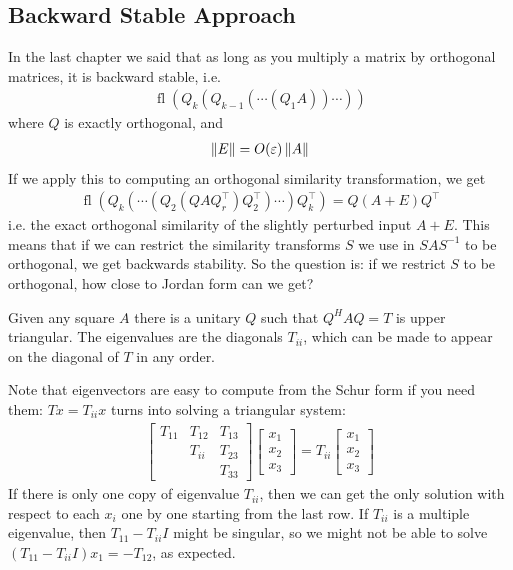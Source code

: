 \documentclass[11pt]{article}
\numberwithin{equation}{section}
\begin{document}
\subsection{Backward Stable Approach}
In the last chapter we said that as long as you multiply a matrix by orthogonal matrices, it is backward stable, i.e. \begin{align*}
    \operatorname{fl}\left(Q_{k}\left(Q_{k-{1}}\left(\cdots\left(Q_{1} A\right)\right) \cdots\right)\right)
\end{align*}
where $Q$ is exactly orthogonal, and \begin{align*}
    \left\| E \right\|=O(\varepsilon)\left\| A \right\|
\end{align*}
If we apply this to computing an orthogonal similarity transformation, we get \begin{align*}
    \operatorname{fl}\left(Q_{k}\left(\cdots \left( Q_{2}\left(Q A Q_{r}^{\top}\right) Q_{2}^{\top}\right) \cdots \right) Q_{k}^{\top}\right) = Q(A+E)Q^\top
\end{align*}
i.e. the exact orthogonal similarity of the slightly perturbed input $A+E$. This means that if we can restrict the similarity transforms $S$ we use in $SAS^{-1}$ to be orthogonal, 
we get backwards stability. So the question is: if we restrict $S$ to be orthogonal, how close to Jordan form can we get? 

\begin{theorem}
    Given any square $A$ there is a unitary $Q$ such that $Q^H AQ = T$ is upper triangular. The eigenvalues are the diagonals $T_{ii}$,
    which can be made to appear on the diagonal of $T$ in any order.
\end{theorem}

Note that eigenvectors are easy to compute from the Schur form if you need them:
$Tx = T_{ii}x$ turns into solving a triangular system: \begin{align*}
    \left[\begin{array}{ccc}
        T_{11} & T_{12} & T_{13} \\
        & T_{ii} & T_{23} \\
        & & T_{33}
        \end{array}\right]\left[\begin{array}{l}
        x_{1} \\
        x_{2} \\
        x_{3}
        \end{array}\right]= T_{ii}\left[\begin{array}{l}
            x_{1} \\
            x_{2} \\
            x_{3}
            \end{array}\right]
\end{align*}
If there is only one copy of eigenvalue $T_{ii}$, then we can get the only solution with respect to each $x_i$ one by one starting from the last row.
If $T_{ii}$ is a multiple eigenvalue, then $T_{11} - T_{ii}I$ might be singular, so we might not be able to solve $(T_{11}-T_{ii}I)x_1 = -T_{12}$, as expected.
\end{document}
